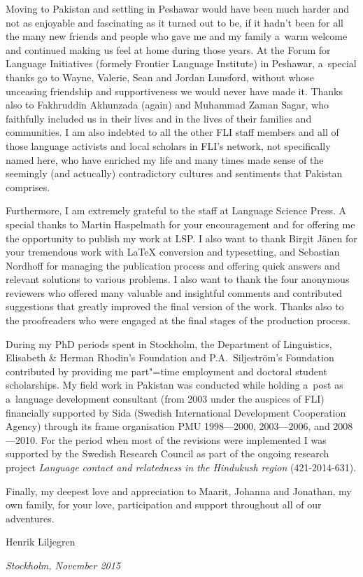 \begin{refsection}
Moving to Pakistan and settling in Peshawar would have been much harder and not as enjoyable and fascinating as it turned out to be, if it hadn't been for all the many new friends and people who gave me and my family a~warm welcome and continued making us feel at home during those years. At the Forum for Language Initiatives (formely Frontier Language Institute) in Peshawar, a~special thanks go to Wayne, Valerie, Sean and Jordan Lunsford, without whose unceasing friendship and supportiveness we would never have made it. Thanks also to Fakhruddin Akhunzada (again) and Muhammad Zaman Sagar, who faithfully included us in their lives and in the lives of their families and communities. I am also indebted to all the other FLI staff members and all of those language activists and local scholars in FLI’s network, not specifically named here, who have enriched my life and many times made sense of the seemingly (and actucally) contradictory cultures and sentiments that Pakistan comprises.


Furthermore, I am extremely grateful to the staff at Language Science Press. A special thanks to Martin Haspelmath for your encouragement and for offering me the opportunity to publish my work at LSP. I also want to thank Birgit Jänen for your tremendous work with LaTeX conversion and typesetting, and Sebastian Nordhoff for managing the publication process and offering quick answers and relevant solutions to various problems. I also want to thank the four anonymous reviewers who offered many valuable and insightful comments and contributed suggestions that greatly improved the final version of the work. Thanks also to the proofreaders who were engaged at the final stages of the production process.


During my PhD periods spent in Stockholm, the Department of Linguistics, Elisabeth \& Herman Rhodin's Foundation and P.A.~Siljeström's Foundation contributed by providing me part"=time employment and doctoral student scholarships. My field work in Pakistan was conducted while holding a~post as a~language development consultant (from 2003 under the auspices of FLI) financially supported by Sida (Swedish International Development Cooperation Agency) through its frame organisation PMU 1998—2000, 2003—2006, and 2008—2010. For the period when most of the revisions were implemented I was supported by the Swedish Research Council as part of the ongoing research project \textit{Language contact and relatedness in the Hindukush region} (421-2014-631).


Finally, my deepest love and appreciation to Maarit, Johanna and Jonathan, my own family, for your love, participation and support throughout all of our adventures.




Henrik Liljegren


\textit{Stockholm, November 2015}


\printbibliography[heading=subbibliography]
\end{refsection}